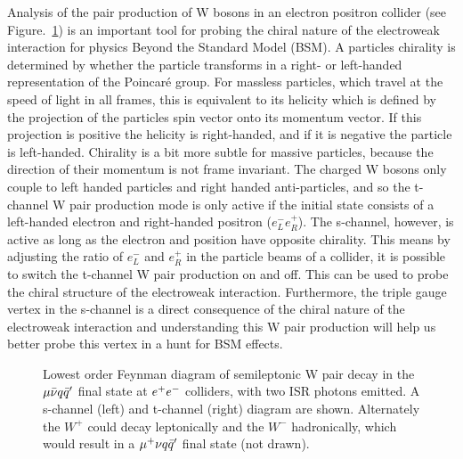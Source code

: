 Analysis of the pair production of W bosons in an electron positron collider (see Figure.~\ref{FEY:SemileptonicDecays}) is an important tool for probing the chiral nature of the electroweak interaction for physics Beyond the Standard Model (BSM). A particles chirality is determined by whether the particle transforms in a right- or left-handed representation of the Poincaré group. For massless particles, which travel at the speed of light in all frames, this is equivalent to its helicity which is defined by the projection of the particles spin vector onto its momentum vector. If this projection is positive the helicity is right-handed, and if it is negative the particle is left-handed. Chirality is a bit more subtle for massive particles, because the direction of their momentum is not frame invariant. The charged W bosons only couple to left handed particles and right handed anti-particles, and so the t-channel W pair production mode is only active if the initial state consists of a left-handed electron and right-handed positron (${e}_{L}^{-}{e}_{R}^{+}$). The s-channel, however, is active as long as the electron and position have opposite chirality. This means by adjusting the ratio of ${e}_{L}^{-}$ and ${e}_{R}^{+}$ in the particle beams of a collider, it is possible to switch the t-channel W pair production on and off. This can be used to probe the chiral structure of the electroweak interaction. Furthermore, the triple gauge vertex in the s-channel is a direct consequence of the chiral nature of the electroweak interaction and understanding this W pair production will help us better probe this vertex in a hunt for BSM effects.
\\
\begin{figure}
  \centering
  
  
  \caption{Lowest order Feynman diagram of semileptonic W pair decay in the $\mu\bar{\nu} q\bar{q}'$ final state at $e^{+}e^{-}$ colliders, with two ISR photons emitted. A s-channel (left) and t-channel (right) diagram are shown. Alternately the ${W}^{+}$ could decay leptonically and the ${W}^{-}$ hadronically, which would result in a $\mu^{+}\nu q\bar{q}'$ final state (not drawn).}
  \label{FEY:SemileptonicDecays}
\end{figure}

